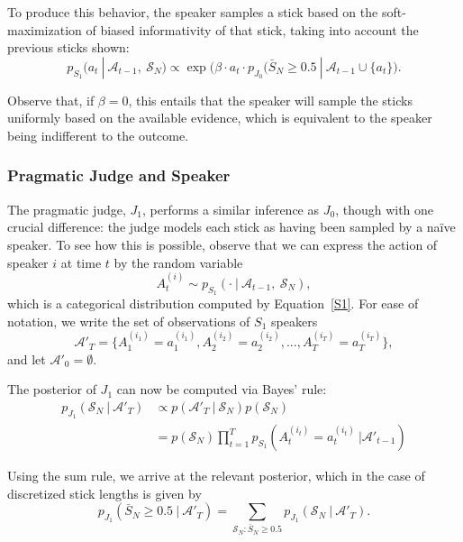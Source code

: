 \documentclass[10pt,letterpaper]{article}
\begin{document}
To produce this behavior, the speaker samples a stick based on the soft-maximization of biased informativity
of that stick, taking into account the previous sticks shown:
\begin{equation}\label{S1}
p_{S_1} (a_t \ | \ \mathcal{A}_{t-1},\ \mathcal{S}_N) \propto \exp \bigl(\beta \cdot a_t \cdot p_{J_0} (\bar{S}_N \ge 0.5 \ | \ \mathcal{A}_{t-1} \cup \{a_t\} \bigr).
\end{equation}

Observe that, if $\beta = 0$, this entails that the speaker will sample the sticks uniformly based on the available
evidence, which is equivalent to the speaker being indifferent to the outcome.

\subsubsection{Pragmatic Judge and Speaker}
The pragmatic judge, $J_1$, performs a similar inference as $J_0$, though with one crucial difference: the judge
models each stick as having been sampled by a na\"ive speaker. To see how this is possible, observe that we can express
the action of speaker $i$ at time $t$ by the random variable 
\begin{equation}
	A_t^{(i)} \sim p_{S_1} (\cdot \ | \ \mathcal{A}_{t-1},\ \mathcal{S}_N),
\end{equation}
which is a categorical distribution computed by Equation~\ref{S1}. For ease of notation, we write the set
of observations of $S_1$ speakers
\begin{equation}
	\mathcal{A}'_T = \{ A_1^{(i_1)}=a_1^{(i_1)}, A_2^{(i_2)}=a_2^{(i_2)}, ..., A_T^{(i_T)}=a_T^{(i_T)}\}, 
\end{equation}
and let $\mathcal{A}'_0 = \emptyset$.

The posterior of $J_1$ can now be computed via Bayes' rule:
\begin{align*}
	p_{J_1} (\mathcal{S}_N \ | \ \mathcal{A}'_T) &\propto p(\mathcal{A}'_T \ | \ \mathcal{S}_N) p(\mathcal{S}_N) \\
	&=  p(\mathcal{S}_N) \prod_{t=1}^T p_{S_1}(A_t^{(i_t)}=a_t^{(i_t)} \ |  \mathcal{A}'_{t-1})
\end{align*}

Using the sum rule, we arrive at the relevant posterior, which in the case of discretized stick lengths is given by
\begin{equation}
	p_{J_1} ( \bar{S}_N \ge 0.5 \ | \ \mathcal{A}'_T ) = \sum_{\mathcal{S}_N \colon \bar{S}_N \ge 0.5} p_{J_1} (\mathcal{S}_N \ | \ \mathcal{A}'_T).
\end{equation}
\end{document}

